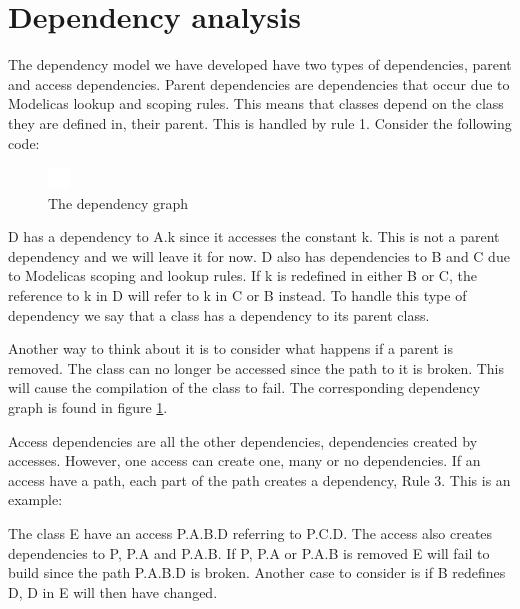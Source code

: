 \documentclass{cslthse-msc}
\begin{document}
\section{Dependency analysis}

The dependency model we have developed have two types of dependencies, parent and access dependencies. Parent dependencies are dependencies that occur due to Modelicas lookup and scoping rules. This means that classes depend on the class they are defined in, their parent. This is handled by rule 1. Consider the following code:


\begin{figure}
    \centering
    \includegraphics[]{EPS-graphs/parent1.eps}
  \caption{The dependency graph}
  \label{fig:parent1graph}
\end{figure}

D has a dependency to A.k since it accesses the constant k. This is not a parent dependency and we will leave it for now. D also has dependencies to B and C due to Modelicas scoping and lookup rules. If k is redefined in either B or C, the reference to k in D will refer to k in C or B instead. To handle this type of dependency we say that a class has a dependency to its parent class.

Another way to think about it is to consider what happens if a parent is removed. The class can no longer be accessed since the path to it is broken. This will cause the compilation of the class to fail. The corresponding dependency graph is found in figure \ref{fig:parent1graph}.

Access dependencies are all the other dependencies, dependencies created by accesses. However, one access can create one, many or no dependencies. If an access have a path, each part of the path creates a dependency, Rule 3. This is an example:

The class E have an access P.A.B.D referring to P.C.D. The access also creates dependencies to P, P.A and P.A.B. If P, P.A or P.A.B is removed E will fail to build since the path P.A.B.D is broken. Another case to consider is if B redefines D, D in E will then have changed.
\end{document}
